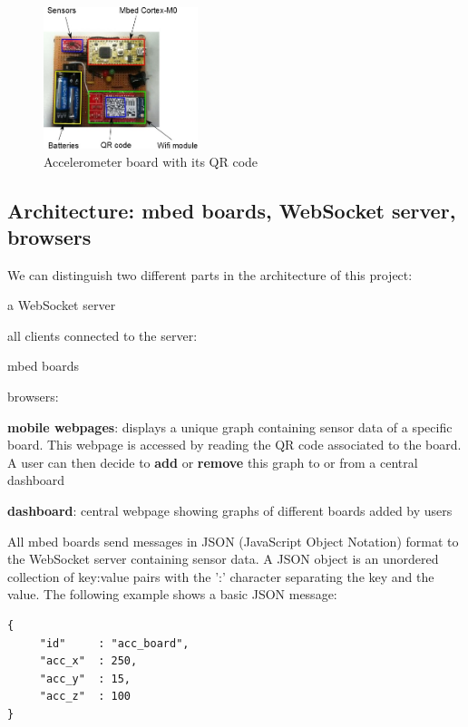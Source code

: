 \documentclass[pdftex,10pt,a4paper]{report}
\newenvironment{packed_item}{
\begin{itemize}
  \setlength{\itemsep}{1pt}
  \setlength{\parskip}{0pt}
  \setlength{\parsep}{0pt}
}{\end{itemize}}
\begin{document}
\begin{figure}[h!]
		\centering
		\includegraphics[width=0.4\textwidth]{./acc_board_component.jpg}
		\caption{Accelerometer board with its QR code}
		\label{Accelerometer board with its QR code}
\end{figure}

\newpage

\subsection{Architecture: mbed boards, WebSocket server, browsers}
We can distinguish two different parts in the architecture of this project:
\begin{packed_item}
	\item a WebSocket server
	\item all clients connected to the server:
	\begin{packed_item}
		\item mbed boards
		\item browsers:
		\begin{packed_item}
			\item \textbf{mobile webpages}: displays a unique graph containing sensor data of a specific board. This webpage is accessed by reading the QR code associated to the board. A user can then decide to \textbf{add} or \textbf{remove} this graph to or from a central dashboard
			\item \textbf{dashboard}: central webpage showing graphs of different boards added by users
		\end{packed_item}
	\end{packed_item}
\end{packed_item}

All mbed boards send messages in JSON (JavaScript Object Notation) format to the WebSocket server containing sensor data. A JSON object is an unordered collection of key:value pairs with the ':' character separating the key and the value. The following example shows a basic JSON message:
\begin{lstlisting}[label=JSON message example,caption=JSON message example]
{
     "id"     : "acc_board",
     "acc_x"  : 250,
     "acc_y"  : 15,
     "acc_z"  : 100
}
\end{lstlisting}
\end{document}
